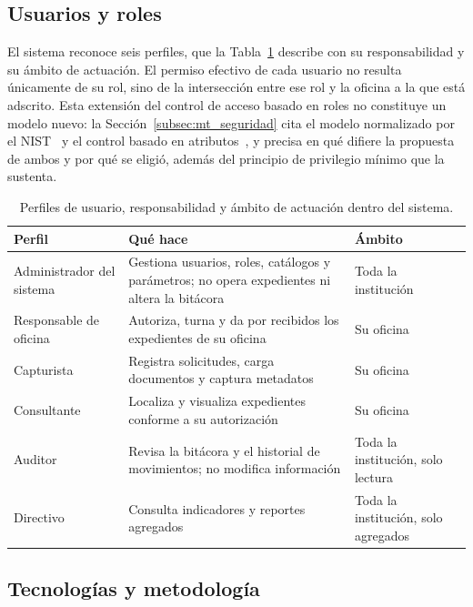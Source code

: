 \subsection{Usuarios y roles}

El sistema reconoce seis perfiles, que la Tabla~\ref{tab:roles} describe con su responsabilidad y su ámbito de actuación. El permiso efectivo de cada usuario no resulta únicamente de su rol, sino de la intersección entre ese rol y la oficina a la que está adscrito. Esta extensión del control de acceso basado en roles no constituye un modelo nuevo: la Sección~\ref{subsec:mt_seguridad} cita el modelo normalizado por el NIST~\cite{ferraiolo2001nist} y el control basado en atributos~\cite{hu2014abac}, y precisa en qué difiere la propuesta de ambos y por qué se eligió, además del principio de privilegio mínimo que la sustenta.

\begin{table}[H]
  \centering
  \small
  \renewcommand{\arraystretch}{1.3}
  \caption{Perfiles de usuario, responsabilidad y ámbito de actuación dentro del sistema.}
  \label{tab:roles}
  \begin{tabularx}{\textwidth}{@{}>{\raggedright\arraybackslash}p{3.0cm}>{\raggedright\arraybackslash}X>{\raggedright\arraybackslash}p{3.1cm}@{}}
    \toprule
    \textbf{Perfil} & \textbf{Qué hace} & \textbf{Ámbito} \\
    \midrule
    Administrador del sistema & Gestiona usuarios, roles, catálogos y parámetros; no opera expedientes ni altera la bitácora & Toda la institución \\
    Responsable de oficina & Autoriza, turna y da por recibidos los expedientes de su oficina & Su oficina \\
    Capturista & Registra solicitudes, carga documentos y captura metadatos & Su oficina \\
    Consultante & Localiza y visualiza expedientes conforme a su autorización & Su oficina \\
    Auditor & Revisa la bitácora y el historial de movimientos; no modifica información & Toda la institución, solo lectura \\
    Directivo & Consulta indicadores y reportes agregados & Toda la institución, solo agregados \\
    \bottomrule
  \end{tabularx}
\end{table}

\subsection{Tecnologías y metodología}


